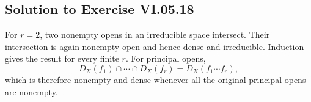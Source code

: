 \subsection*{Solution to Exercise VI.05.18}
For \(r=2\), two nonempty opens in an irreducible space intersect.  Their intersection is
again nonempty open and hence dense and irreducible.  Induction gives the result for every
finite \(r\).  For principal opens,
\[
D_X(f_1)\cap\cdots\cap D_X(f_r)=D_X(f_1\cdots f_r),
\]
which is therefore nonempty and dense whenever all the original principal opens are
nonempty.
